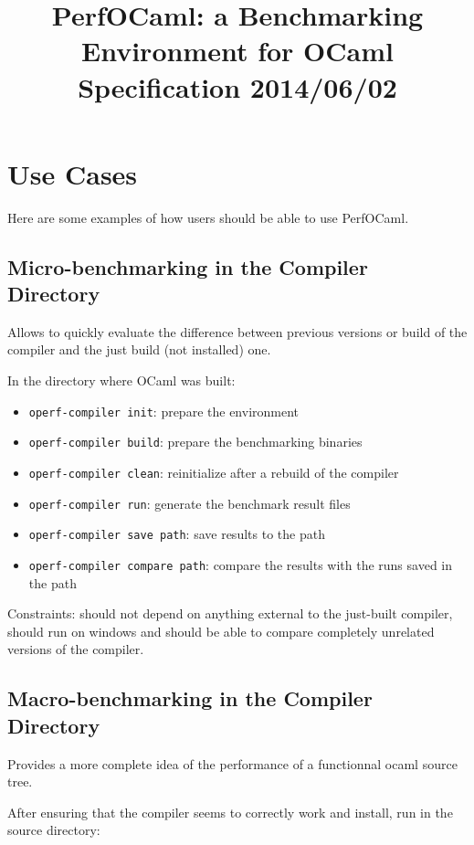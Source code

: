 \documentclass[11pt,a4paper]{article}
\begin{document}
\title{PerfOCaml: a Benchmarking Environment for OCaml\\Specification 2014/06/02}

\maketitle
\tableofcontents
\section{Use Cases}

Here are some examples of how users should be able to use PerfOCaml.

\subsection{Micro-benchmarking in the Compiler Directory}

Allows to quickly evaluate the difference between previous versions or
build of the compiler and the just build (not installed) one.

In the directory where OCaml was built:
\begin{itemize}
\item {\tt operf-compiler init}: prepare the environment
\item {\tt operf-compiler build}: prepare the benchmarking binaries
\item {\tt operf-compiler clean}: reinitialize after a rebuild of the compiler
\item {\tt operf-compiler run}: generate the benchmark result files
\item {\tt operf-compiler save path}: save results to the path
\item {\tt operf-compiler compare path}: compare the results with the runs saved in the path
\end{itemize}

Constraints: should not depend on anything external to the just-built
compiler, should run on windows and should be able to compare
completely unrelated versions of the compiler.

\subsection{Macro-benchmarking in the Compiler Directory}

Provides a more complete idea of the performance of a functionnal
ocaml source tree.

After ensuring that the compiler seems to correctly work and install,
run in the source directory:
\end{document}
